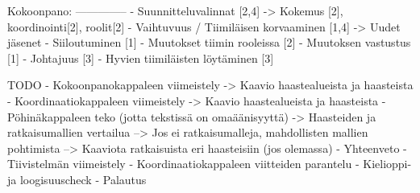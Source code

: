 Kokoonpano:
--------------
- Suunnitteluvalinnat                       [2,4]
    -> Kokemus [2], koordinointi[2], roolit[2]
- Vaihtuvuus / Tiimiläisen korvaaminen      [1,4]
    -> Uudet jäsenet
- Siiloutuminen                             [1]
- Muutokset tiimin rooleissa                [2]
- Muutoksen vastustus                       [1]
- Johtajuus                                 [3]
- Hyvien tiimiläisten löytäminen            [3]

    TODO    
- Kokoonpanokappaleen viimeistely
-> Kaavio haastealueista ja haasteista
- Koordinaatiokappaleen viimeistely
-> Kaavio haastealueista ja haasteista
- Pöhinäkappaleen teko (jotta tekstissä on omaäänisyyttä)
-> Haasteiden ja ratkaisumallien vertailua
--> Jos ei ratkaisumalleja, mahdollisten mallien pohtimista
--> Kaaviota ratkaisuista eri haasteisiin (jos olemassa)
- Yhteenveto
- Tiivistelmän viimeistely
- Koordinaatiokappaleen viitteiden parantelu
- Kielioppi- ja loogisuuscheck
- Palautus
